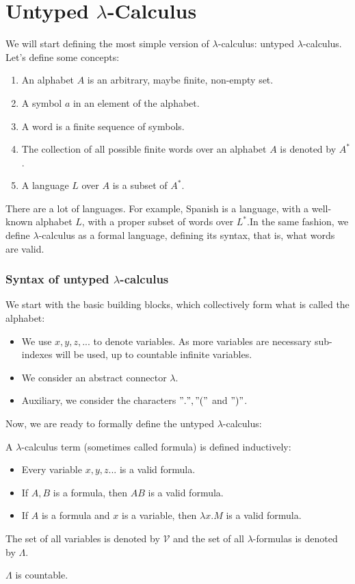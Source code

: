 \section{Untyped $\lambda$-Calculus }
We will start defining the most simple version of $\lambda$-calculus: untyped $\lambda$-calculus. Let's define some concepts:


\begin{enumerate}
\item An alphabet $A$ is an arbitrary, maybe finite, non-empty set.
\item A symbol $a$ in an element of the alphabet.
\item A word is a finite sequence of symbols.
\item The collection of all possible finite words over an alphabet $A$ is denoted by $A^*$.
\item A language $L$ over $A$  is a subset of $A^*.$
\end{enumerate}

There are a lot of languages. For example, Spanish is a language, with a well-known alphabet $L$, with a proper subset of words over $L^*$.In the same fashion, we define $\lambda$-calculus as a formal language, defining its syntax, that is, what words are valid.


\subsubsection{Syntax of untyped $\lambda$-calculus}
We start with the basic building blocks, which collectively form what is
called the alphabet:

\begin{itemize}
\item We use $x, y, z,...$ to denote variables. As more variables are necessary sub-indexes will be used, up to countable infinite variables.
\item We consider an abstract connector $\lambda$.
\item Auxiliary, we consider the characters $".", "("$ and $")"$.
\end{itemize}
Now, we are ready to formally define the untyped $\lambda$-calculus:

\begin{definition}\label{def:untyped-lambda-calc}
  A $\lambda$-calculus term (sometimes called formula) is defined inductively:
  \begin{itemize}
  \item Every variable $x,y,z...$ is a valid formula.
  \item If $A,B$ is a formula, then $AB$ is a valid formula.
  \item If $A$ is a formula and $x$ is a variable, then $\lambda x.M$ is a valid formula.
  \end{itemize}
  The set of all variables is denoted by $\mathcal{V}$ and the set of all $\lambda$-formulas is denoted by $\Lambda$.
\end{definition}
\begin{remark}
  $\Lambda$ is countable.
\end{remark}


